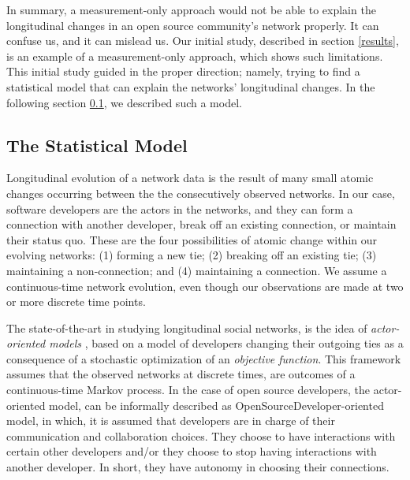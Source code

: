 \documentclass[11pt]{report}
\begin{document}
In summary, a measurement-only approach would not be able to explain the longitudinal changes in an open source community's network properly. It can confuse us, and it can mislead us. Our initial study, described in section \ref{results}, is an example of a measurement-only approach, which shows such limitations. This initial study guided in the proper direction; namely, trying to find a statistical model that can explain the networks' longitudinal changes. In the following section \ref{statisticalModel}, we described such a model.  


%

\subsection{The Statistical Model}
\label{statisticalModel}

Longitudinal evolution of a network data is the result of many small atomic changes occurring between the the consecutively observed networks. In our case, software developers are the actors in the networks, and they can form a connection with another developer, break off an existing connection, or maintain their status quo. These are the four possibilities of atomic change within our evolving networks: (1) forming a new tie; (2) breaking off an existing tie; (3) maintaining a non-connection; and (4) maintaining a connection. We assume a continuous-time network evolution, even though our observations are made at two or more discrete time points. 

The state-of-the-art in studying longitudinal social networks, is the idea of \textit{actor-oriented models} \cite{Snijders2010}, based on a model of developers changing their outgoing ties as a consequence of a stochastic optimization of an \textit{objective function}. This framework assumes that the observed networks at discrete times, are outcomes of a continuous-time Markov process. In the case of open source developers, the actor-oriented model, can be informally described as OpenSourceDeveloper-oriented model, in which, it is assumed that developers are in charge of their communication and collaboration choices. They choose to have interactions with certain other developers and/or they choose to stop having interactions with another developer. In short, they have autonomy in choosing their connections.
\end{document}
